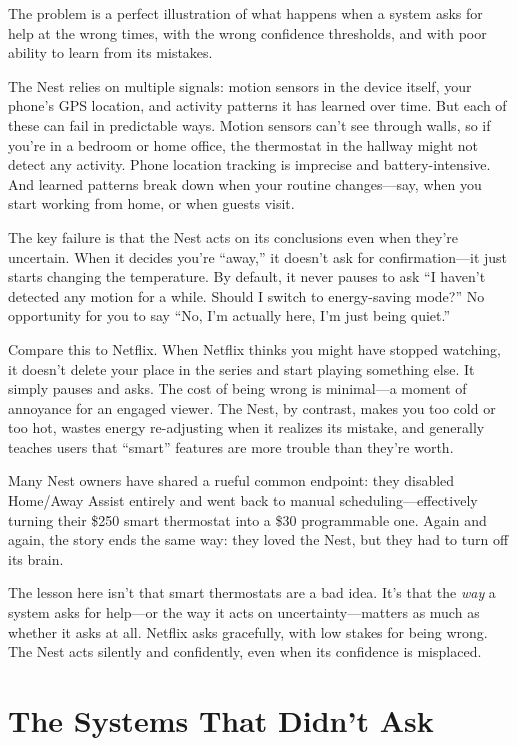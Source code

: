 The problem is a perfect illustration of what happens when a system asks for help at the wrong times, with the wrong confidence thresholds, and with poor ability to learn from its mistakes.

The Nest relies on multiple signals: motion sensors in the device itself, your phone's GPS location, and activity patterns it has learned over time. But each of these can fail in predictable ways. Motion sensors can't see through walls, so if you're in a bedroom or home office, the thermostat in the hallway might not detect any activity. Phone location tracking is imprecise and battery-intensive. And learned patterns break down when your routine changes---say, when you start working from home, or when guests visit.

The key failure is that the Nest acts on its conclusions even when they're uncertain. When it decides you're ``away,'' it doesn't ask for confirmation---it just starts changing the temperature. By default, it never pauses to ask ``I haven't detected any motion for a while. Should I switch to energy-saving mode?'' No opportunity for you to say ``No, I'm actually here, I'm just being quiet.''

Compare this to Netflix. When Netflix thinks you might have stopped watching, it doesn't delete your place in the series and start playing something else. It simply pauses and asks. The cost of being wrong is minimal---a moment of annoyance for an engaged viewer. The Nest, by contrast, makes you too cold or too hot, wastes energy re-adjusting when it realizes its mistake, and generally teaches users that ``smart'' features are more trouble than they're worth.

Many Nest owners have shared a rueful common endpoint: they disabled Home/Away Assist entirely and went back to manual scheduling---effectively turning their \$250 smart thermostat into a \$30 programmable one. Again and again, the story ends the same way: they loved the Nest, but they had to turn off its brain.

The lesson here isn't that smart thermostats are a bad idea. It's that the \emph{way} a system asks for help---or the way it acts on uncertainty---matters as much as whether it asks at all. Netflix asks gracefully, with low stakes for being wrong. The Nest acts silently and confidently, even when its confidence is misplaced.

\section{The Systems That Didn't Ask}


